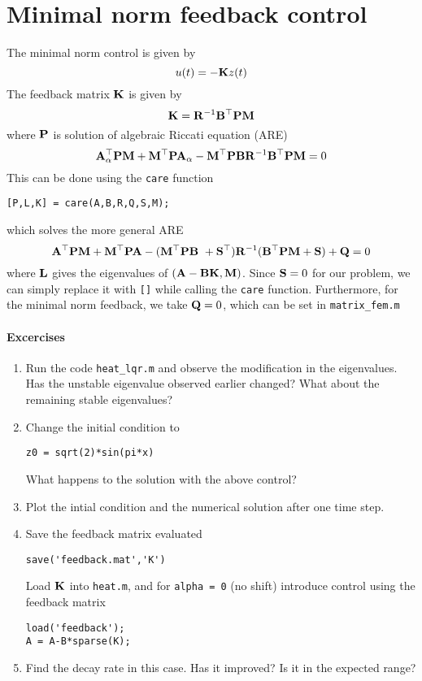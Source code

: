 \documentclass[12pt]{article}
\begin{document}
\section{Minimal norm feedback control}
The minimal norm control is given by
\[
u(t) = - {\mathbf K} z (t)
\]
The feedback matrix ${\mathbf K}$ is given by
\[
{\mathbf K} = {\mathbf R}^{-1} {\mathbf B}^\top {\mathbf P} {\mathbf M}
\]
where ${\mathbf P}$ is solution of algebraic Riccati equation (ARE)
\[
{\mathbf A}^\top_\alpha {\mathbf P} {\mathbf M} + {\mathbf M}^\top {\mathbf P} {\mathbf A}_\alpha - {\mathbf M}^\top {\mathbf P} {\mathbf B} {\mathbf R}^{-1} {\mathbf B}^\top {\mathbf P} {\mathbf M}  = 0
\]
This can be done using the {\tt care} function
\begin{lstlisting}
[P,L,K] = care(A,B,R,Q,S,M);
\end{lstlisting}
which solves the more general ARE
\[
{\mathbf A}^\top {\mathbf P} {\mathbf M} + {\mathbf M}^\top {\mathbf P} {\mathbf A} - ({\mathbf M}^\top {\mathbf P} {\mathbf B} \ + {\mathbf S}^\top)  {\mathbf R}^{-1} ({\mathbf B}^\top {\mathbf P} {\mathbf M} +{\mathbf S}) + {\mathbf Q} = 0
\]
where ${\mathbf L}$ gives the eigenvalues of $({\mathbf A}- {\mathbf B} {\mathbf K},{\mathbf M})$. Since ${\mathbf S}=0$ for our problem, we can simply replace it with {\tt []} while calling the {\tt care} function. Furthermore, for the minimal norm feedback, we take ${\mathbf Q}=0$, which can be set in {\tt matrix\_fem.m}
\paragraph{Excercises}

\begin{enumerate}
\item Run the code {\tt heat\_lqr.m} and observe the modification in the eigenvalues. Has the unstable eigenvalue observed earlier changed? What about the remaining stable eigenvalues?

\item Change the initial condition to
\begin{lstlisting}
z0 = sqrt(2)*sin(pi*x)
\end{lstlisting}
What happens to the solution with the above control?

\item Plot the intial condition and the numerical solution after one time step.  

\item Save the feedback matrix evaluated
\begin{lstlisting}
save('feedback.mat','K')
\end{lstlisting}
Load ${\mathbf K}$ into {\tt heat.m}, and for {\tt alpha = 0} (no shift) introduce control using the feedback matrix
\begin{lstlisting}
load('feedback');
A = A-B*sparse(K);
\end{lstlisting}

\item Find the decay rate in this case. Has it improved? Is it in the expected range?      
\end{enumerate}
\end{document}
